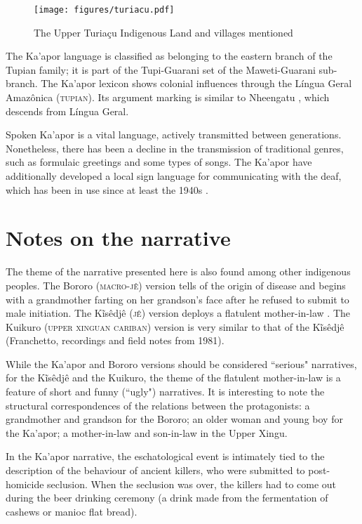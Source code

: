 \documentclass[output=paper,
modfonts,nonflat
]{langsci/langscibook}
\begin{document}
\begin{figure}[h!]
  \caption{The Upper Turiaçu Indigenous Land and villages mentioned}
  \centering
\texttt{[image: figures/turiacu.pdf]}
\end{figure}
    
	The Ka’apor language is classified as belonging to the eastern branch of the Tupian family; it is part of the Tupi-Guarani set of the Maweti-Guarani sub-branch. The Ka’apor lexicon \citep{Corrêa-da-Silva1997,Balée2006} shows colonial influences through the Língua Geral Amazônica (\textsc{tupian}). Its argument marking is similar to Nheengatu \citep{Corrêa-da-Silva2002}, which descends from Língua Geral.
    
    \newpage 
	Spoken Ka’apor is a vital language, actively transmitted between generations. Nonetheless, there has been a decline in the transmission of traditional genres, such as formulaic greetings and some types of songs. The Ka’apor have additionally developed a local sign language for communicating with the deaf, which has been in use since at least the 1940s \citep{KakumasuKakumasu1988,Ferreirand,Ferreira1984,Ferreira2010}.


\section{Notes on the narrative}

	The theme of the narrative presented here is also found among other indigenous peoples. The Bororo (\textsc{macro-jê}) version tells of the origin of disease and begins with a grandmother farting on her grandson’s face after he refused to submit to male initiation. The Kĩsêdjê (\textsc{jê}) version deploys a flatulent mother-in-law \citep[1--2]{Nonato2016}. The Kuikuro (\textsc{upper xinguan cariban}) version is very similar to that of the Kĩsêdjê (Franchetto, recordings and field notes from 1981).
    
	While the Ka’apor and Bororo versions should be considered “serious" narratives, for the Kĩsêdjê and the Kuikuro, the theme of the flatulent mother-in-law is a feature of short and funny (“ugly") narratives. It is interesting to note the structural correspondences of the relations between the protagonists: a grandmother and grandson for the Bororo; an   older woman and young boy for the Ka’apor; a mother-in-law and son-in-law in the Upper Xingu.
    
	In the Ka’apor narrative, the eschatological event is intimately tied to the description of the behaviour of ancient killers, who were submitted to post-ho\-mi\-cide seclusion. When the seclusion was over, the killers had to come out during the beer drinking ceremony (a drink made from the fermentation of cashews or manioc flat bread).
    
\end{document}
